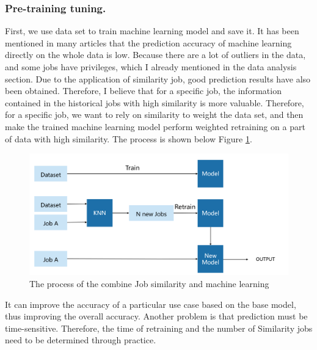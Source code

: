 \documentclass[conference,compsoc]{IEEEtran}
\begin{document}
\subsubsection{Pre-training tuning.}
	First, we use data set to train machine learning model and save it. It has been mentioned in many articles that the prediction accuracy of machine learning directly on the whole data is low. Because there are a lot of outliers in the data, and some jobs have privileges, which I already mentioned in the data analysis section. Due to the application of similarity job, good prediction results have also been obtained. Therefore, I believe that for a specific job, the information contained in the historical jobs with high similarity is more valuable. Therefore, for a specific job, we want to rely on similarity to weight the data set, and then make the trained machine learning model perform weighted retraining on a part of data with high similarity. The process is shown below Figure \ref{Fig:6}.
	
	\begin{figure}[htbp]   %
	
	\centering
	
	\includegraphics[width=\linewidth,scale=1.00]{Model1.png}
	
	\caption{The process of the combine Job similarity and machine learning}
	
	\label{Fig:6}
	
	\end{figure}

	It can improve the accuracy of a particular use case based on the base model, thus improving the overall accuracy. Another problem is that prediction must be time-sensitive. Therefore, the time of retraining and the number of Similarity jobs need to be determined through practice.
\end{document}
